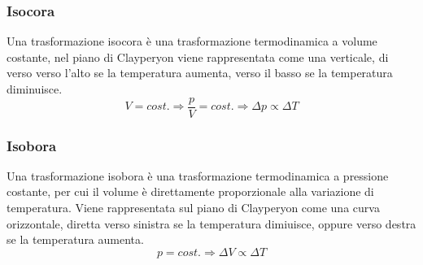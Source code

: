 \documentclass{article}
\numberwithin{equation}{subsection}
\begin{document}
\subsubsection{Isocora}
Una trasformazione isocora è una trasformazione termodinamica 
a volume costante, nel piano di Clayperyon viene rappresentata 
come una verticale, di verso verso l'alto se la temperatura 
aumenta, verso il basso se la temperatura diminuisce. 
\begin{equation}
    V=cost.\Rightarrow
    \displaystyle\frac{p}{V}=cost.\Rightarrow
    \Delta p \propto\Delta T
\end{equation}

\begin{center}\end{center}

\subsubsection{Isobora}
Una trasformazione isobora è una trasformazione 
termodinamica a pressione costante, per cui il 
volume è direttamente proporzionale alla variazione di 
temperatura. Viene rappresentata sul piano di Clayperyon come 
una curva orizzontale, diretta verso sinistra se la 
temperatura dimiuisce, oppure verso destra se la temperatura 
aumenta. 
\begin{equation}
    p=cost.\Rightarrow \Delta V\propto\Delta T
\end{equation}

\begin{center}\end{center}
\end{document}
